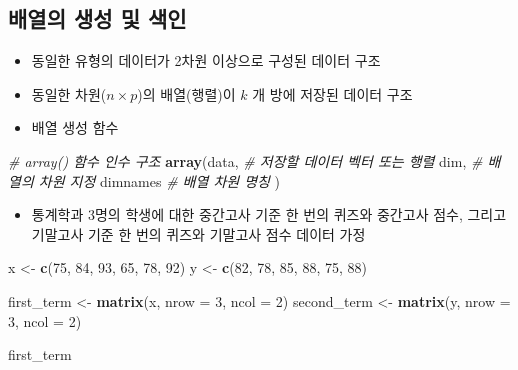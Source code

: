 \documentclass[
  11pt,
]{krantz}
\newenvironment{Shaded}{\begin{snugshade}}{\end{snugshade}}
\newcommand{\CommentTok}[1]{\textcolor[rgb]{0.37,0.37,0.37}{\textit{#1}}}
\newcommand{\DataTypeTok}[1]{\textcolor[rgb]{0.27,0.27,0.27}{#1}}
\newcommand{\DecValTok}[1]{\textcolor[rgb]{0.06,0.06,0.06}{#1}}
\newcommand{\KeywordTok}[1]{\textcolor[rgb]{0.27,0.27,0.27}{\textbf{#1}}}
\newcommand{\NormalTok}[1]{#1}
\newcommand{\StringTok}[1]{\textcolor[rgb]{0.5,0.5,0.5}{#1}}
\providecommand{\tightlist}{%
  \setlength{\itemsep}{0pt}\setlength{\parskip}{0pt}}
\begin{document}
\hypertarget{make-array}{%
\subsection{배열의 생성 및 색인}\label{make-array}}

\begin{itemize}
\tightlist
\item
  동일한 유형의 데이터가 2차원 이상으로 구성된 데이터 구조
\item
  동일한 차원(\(n\times p\))의 배열(행렬)이 \(k\) 개 방에 저장된 데이터 구조
\item
  배열 생성 함수
\end{itemize}

\footnotesize

\begin{Shaded}
\begin{Highlighting}[]
\CommentTok{# array() 함수 인수 구조}
\KeywordTok{array}\NormalTok{(data, }\CommentTok{# 저장할 데이터 벡터 또는 행렬}
\NormalTok{      dim,  }\CommentTok{# 배열의 차원 지정}
\NormalTok{      dimnames }\CommentTok{# 배열 차원 명칭}
\NormalTok{      )}
\end{Highlighting}
\end{Shaded}

\normalsize

\begin{itemize}
\tightlist
\item
  통계학과 3명의 학생에 대한 중간고사 기준 한 번의 퀴즈와 중간고사 점수, 그리고 기말고사 기준 한 번의 퀴즈와 기말고사 점수 데이터 가정
\end{itemize}

\footnotesize

\begin{Shaded}
\begin{Highlighting}[]
\NormalTok{x <-}\StringTok{ }\KeywordTok{c}\NormalTok{(}\DecValTok{75}\NormalTok{, }\DecValTok{84}\NormalTok{, }\DecValTok{93}\NormalTok{, }\DecValTok{65}\NormalTok{, }\DecValTok{78}\NormalTok{, }\DecValTok{92}\NormalTok{)}
\NormalTok{y <-}\StringTok{ }\KeywordTok{c}\NormalTok{(}\DecValTok{82}\NormalTok{, }\DecValTok{78}\NormalTok{, }\DecValTok{85}\NormalTok{, }\DecValTok{88}\NormalTok{, }\DecValTok{75}\NormalTok{, }\DecValTok{88}\NormalTok{)}

\NormalTok{first_term <-}\StringTok{ }\KeywordTok{matrix}\NormalTok{(x, }\DataTypeTok{nrow =} \DecValTok{3}\NormalTok{, }\DataTypeTok{ncol =} \DecValTok{2}\NormalTok{)}
\NormalTok{second_term <-}\StringTok{ }\KeywordTok{matrix}\NormalTok{(y, }\DataTypeTok{nrow =} \DecValTok{3}\NormalTok{, }\DataTypeTok{ncol =} \DecValTok{2}\NormalTok{)}

\NormalTok{first_term}
\end{Highlighting}
\end{Shaded}
\end{document}
